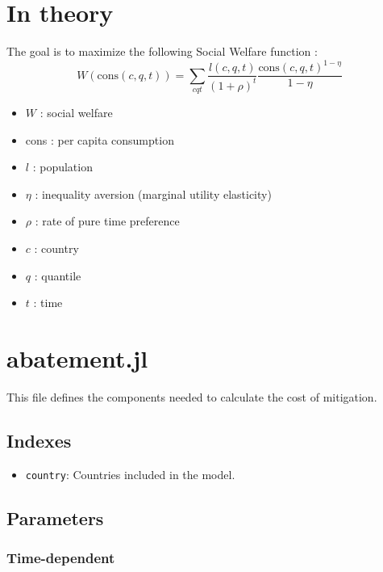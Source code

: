 \documentclass[
]{article}
\providecommand{\tightlist}{%
  \setlength{\itemsep}{0pt}\setlength{\parskip}{0pt}}
\begin{document}
\section{In theory}

The goal is to maximize the following Social Welfare function : 
\begin{equation} 
W(\text{cons}(c,q,t)) = \sum_{cqt} \frac{l(c,q,t)}{(1+\rho)^t}\frac{\text{cons}(c,q,t)^{1-\eta}}{1 - \eta}
\end{equation}

\begin{itemize}
\item $W$ : social welfare
\item cons :  per capita consumption
\item $l$ : population
\item $\eta$ : inequality aversion (marginal utility elasticity)
\item $\rho$ : rate of pure time preference
\item $c$ : country
\item $q$ : quantile
\item $t$ : time
\end{itemize}


\section{abatement.jl}\label{abatement.jl}

This file defines the components needed to calculate the cost of
mitigation.

\subsection{Indexes}\label{indexes}

\begin{itemize}
\tightlist
\item
  \texttt{country}: Countries included in the model.

\end{itemize}

\subsection{Parameters}\label{parameters}

\subsubsection{Time-dependent}\label{time-dependent}
\end{document}
